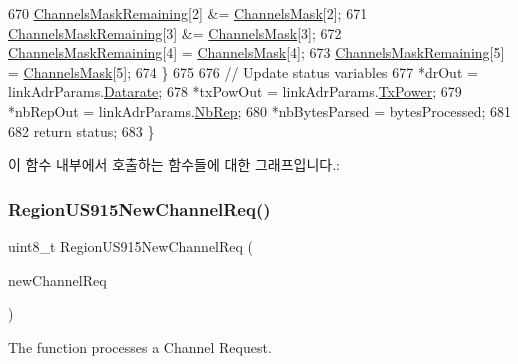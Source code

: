 \begin{DoxyCode}
670         \mbox{\hyperlink{_region_u_s915_8c_a567333cec639a004655cc1717e9d0928}{ChannelsMaskRemaining}}[2] &= \mbox{\hyperlink{_region_u_s915_8c_a2188957b5ca6af8092154d7ccbfa5757}{ChannelsMask}}[2];
671         \mbox{\hyperlink{_region_u_s915_8c_a567333cec639a004655cc1717e9d0928}{ChannelsMaskRemaining}}[3] &= \mbox{\hyperlink{_region_u_s915_8c_a2188957b5ca6af8092154d7ccbfa5757}{ChannelsMask}}[3];
672         \mbox{\hyperlink{_region_u_s915_8c_a567333cec639a004655cc1717e9d0928}{ChannelsMaskRemaining}}[4] = \mbox{\hyperlink{_region_u_s915_8c_a2188957b5ca6af8092154d7ccbfa5757}{ChannelsMask}}[4];
673         \mbox{\hyperlink{_region_u_s915_8c_a567333cec639a004655cc1717e9d0928}{ChannelsMaskRemaining}}[5] = \mbox{\hyperlink{_region_u_s915_8c_a2188957b5ca6af8092154d7ccbfa5757}{ChannelsMask}}[5];
674     \}
675 
676     \textcolor{comment}{// Update status variables}
677     *drOut = linkAdrParams.\mbox{\hyperlink{structs_region_common_link_adr_params_ae2f6080f3aa0e9485c55513ca56bb24d}{Datarate}};
678     *txPowOut = linkAdrParams.\mbox{\hyperlink{structs_region_common_link_adr_params_a037b4f849fa8ed4aa1d3c58aef2b28ec}{TxPower}};
679     *nbRepOut = linkAdrParams.\mbox{\hyperlink{structs_region_common_link_adr_params_a3b99538671d86dbfe2f6754ce6f9577a}{NbRep}};
680     *nbBytesParsed = bytesProcessed;
681 
682     \textcolor{keywordflow}{return} status;
683 \}
\end{DoxyCode}
이 함수 내부에서 호출하는 함수들에 대한 그래프입니다.\+:
\mbox{\label{group___r_e_g_i_o_n_u_s915_gaf6b93716eae04bcc5a2072b2f071fb0d}} 
\subsubsection{\texorpdfstring{Region\+U\+S915\+New\+Channel\+Req()}{RegionUS915NewChannelReq()}}
{\footnotesize\ttfamily uint8\+\_\+t Region\+U\+S915\+New\+Channel\+Req (\begin{DoxyParamCaption}\item[{\mbox{\hyperlink{group___r_e_g_i_o_n_gae2abcdb6dbb843c9faf5fd3009eca9d6}{New\+Channel\+Req\+Params\+\_\+t}} $\ast$}]{new\+Channel\+Req }\end{DoxyParamCaption})}



The function processes a Channel Request. 


